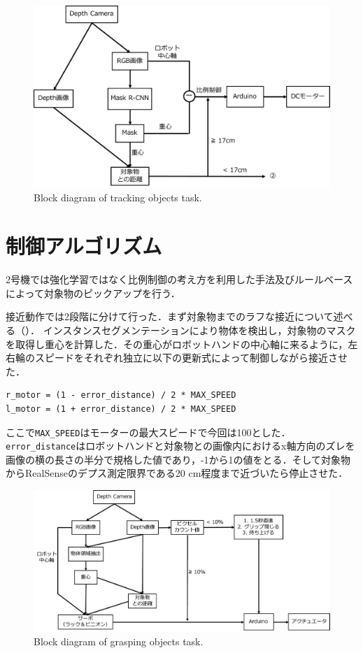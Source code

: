 \begin{figure}
    \centering
    \includegraphics[width=0.7\linewidth]{figure/chapter4/2号機制御図_接近}
    \caption{Block diagram of tracking objects task.}
    \label{fig:2号機接近}
\end{figure}


\section{制御アルゴリズム}
2号機では強化学習ではなく比例制御の考え方を利用した手法及びルールベースによって対象物のピックアップを行う．

接近動作では2段階に分けて行った．まず対象物までのラフな接近について述べる（）．
インスタンスセグメンテーションにより物体を検出し，対象物のマスクを取得し重心を計算した．その重心がロボットハンドの中心軸に来るように，左右輪のスピードをそれぞれ独立に以下の更新式によって制御しながら接近させた．
\begin{lstlisting}[caption=接近アルゴリズム, label=code:motor]
r_motor = (1 - error_distance) / 2 * MAX_SPEED
l_motor = (1 + error_distance) / 2 * MAX_SPEED
\end{lstlisting}
ここで\texttt{MAX\_SPEED}はモーターの最大スピードで今回は100とした．\texttt{error\_distance}はロボットハンドと対象物との画像内におけるx軸方向のズレを画像の横の長さの半分で規格した値であり，-1から1の値をとる．そして対象物からRealSenseのデプス測定限界である20 cm程度まで近づいたら停止させた．

\begin{figure}
    \centering
    \includegraphics[width=0.7\linewidth]{figure/chapter4/2号機制御図_把持}
    \caption{Block diagram of grasping objects task.}
    \label{fig:2号機把持}
\end{figure}

